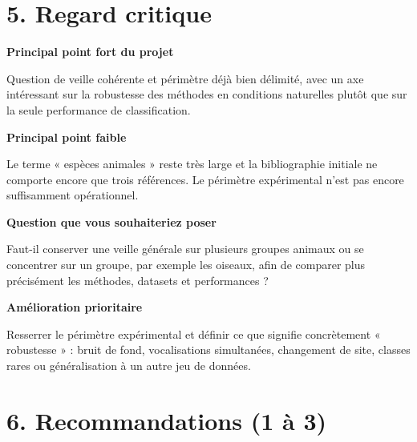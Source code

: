 \documentclass[11pt,a4paper]{article}
\newcommand{\reviewquestion}[1]{\textbf{#1}\par}
\begin{document}
\section*{5. Regard critique}

\reviewquestion{Principal point fort du projet}
Question de veille cohérente et périmètre déjà bien délimité, avec un axe intéressant sur la robustesse des méthodes en conditions naturelles plutôt que sur la seule performance de classification.

\reviewquestion{Principal point faible}
Le terme « espèces animales » reste très large et la bibliographie initiale ne comporte encore que trois références. Le périmètre expérimental n'est pas encore suffisamment opérationnel.

\reviewquestion{Question que vous souhaiteriez poser}
Faut-il conserver une veille générale sur plusieurs groupes animaux ou se concentrer sur un groupe, par exemple les oiseaux, afin de comparer plus précisément les méthodes, datasets et performances ?

\reviewquestion{Amélioration prioritaire}
Resserrer le périmètre expérimental et définir ce que signifie concrètement « robustesse » : bruit de fond, vocalisations simultanées, changement de site, classes rares ou généralisation à un autre jeu de données.

\section*{6. Recommandations (1 à 3)}
\end{document}

